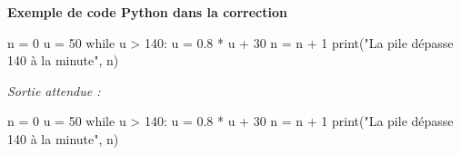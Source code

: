 \documentclass[a4paper,10pt]{article}  %
\begin{document}
\begin{Correction}[width=0.9\linewidth, height=7cm]
\textbf{Exemple de code Python dans la correction}
\begin{pyverbatim}[breaklines=true, numbers=left, fontsize=\small, frame=single, rulecolor=\color{gray!50}]
n = 0
u = 50
while u > 140:
    u = 0.8 * u + 30
    n = n + 1
print("La pile dépasse 140 à la minute", n)
\end{pyverbatim}
\medskip
\small\textit{Sortie attendue :}
\begin{pythontex}[fontsize=\footnotesize]
n = 0
u = 50
while u > 140:
    u = 0.8 * u + 30
    n = n + 1
print("La pile dépasse 140 à la minute", n)
\end{pythontex}
\end{Correction}
\end{document}
